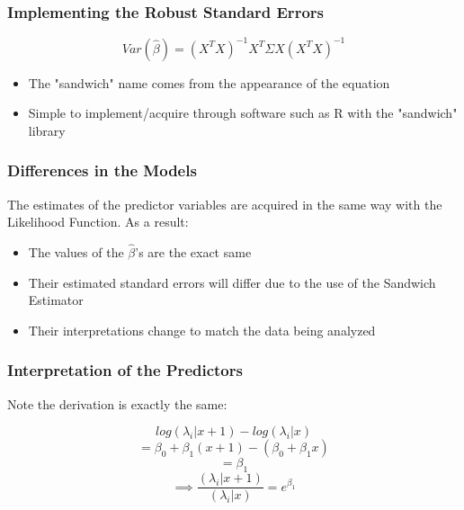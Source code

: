 \documentclass{beamer}
\begin{document}
\begin{frame}[fragile]\frametitle{Implementing the Robust Standard Errors}
	
	$$ Var(\hat{\beta}) = (X^{T}X)^{-1}X^{T} \Sigma X(X^{T}X)^{-1} $$
		
	\begin{itemize}
	
		\item The "sandwich" name comes from the appearance of the equation
		
		\item Simple to implement/acquire through software such as R with the "sandwich" library
		
	\end{itemize}
	
\end{frame}



\begin{frame}[fragile]\frametitle{Differences in the Models}

	The estimates of the predictor variables are acquired in the same way with the Likelihood Function. As a result:	
	\begin{itemize}

		\item The values of the $\hat{\beta}$'s are the exact same
		
		\item Their estimated standard errors will differ due to the use of the Sandwich Estimator
		
		\item Their interpretations change to match the data being analyzed

	\end{itemize}
	
\end{frame}



\begin{frame}[fragile]\frametitle{Interpretation of the Predictors}

	Note the derivation is exactly the same:
	
	$$ log(\lambda_i|x+1) - log(\lambda_i|x) $$
	$$ = \beta_0 + \beta_1 (x + 1) - (\beta_0 + \beta_1 x)$$ 
	$$ = \beta_1 $$
	$$ \implies \frac{(\lambda_i|x+1)}{(\lambda_i|x)} = e^{\beta_1} $$
	
\end{frame}
\end{document}
